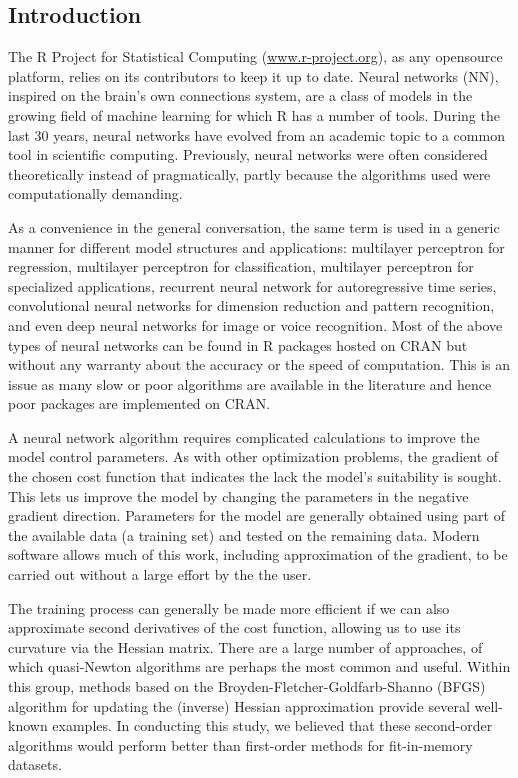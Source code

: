 \hypertarget{introduction}{%
\subsection{Introduction}\label{introduction}}

The \textsf{R} Project for Statistical Computing
(\url{www.r-project.org}), as any opensource platform, relies on its
contributors to keep it up to date. Neural networks (NN), inspired on
the brain's own connections system, are a class of models in the growing
field of machine learning for which R has a number of tools. During the
last 30 years, neural networks have evolved from an academic topic to a
common tool in scientific computing. Previously, neural networks were
often considered theoretically instead of pragmatically, partly because
the algorithms used were computationally demanding.

As a convenience in the general conversation, the same term is used in a
generic manner for different model structures and applications:
multilayer perceptron for regression, multilayer perceptron for
classification, multilayer perceptron for specialized applications,
recurrent neural network for autoregressive time series, convolutional
neural networks for dimension reduction and pattern recognition, and
even deep neural networks for image or voice recognition. Most of the
above types of neural networks can be found in R packages hosted on CRAN
but without any warranty about the accuracy or the speed of computation.
This is an issue as many slow or poor algorithms are available in the
literature and hence poor packages are implemented on CRAN.

A neural network algorithm requires complicated calculations to improve
the model control parameters. As with other optimization problems, the
gradient of the chosen cost function that indicates the lack the model's
suitability is sought. This lets us improve the model by changing the
parameters in the negative gradient direction. Parameters for the model
are generally obtained using part of the available data (a training set)
and tested on the remaining data. Modern software allows much of this
work, including approximation of the gradient, to be carried out without
a large effort by the the user.

The training process can generally be made more efficient if we can also
approximate second derivatives of the cost function, allowing us to use
its curvature via the Hessian matrix. There are a large number of
approaches, of which quasi-Newton algorithms are perhaps the most common
and useful. Within this group, methods based on the
Broyden-Fletcher-Goldfarb-Shanno (BFGS) algorithm for updating the
(inverse) Hessian approximation provide several well-known examples. In
conducting this study, we believed that these second-order algorithms
would perform better than first-order methods for fit-in-memory
datasets.

